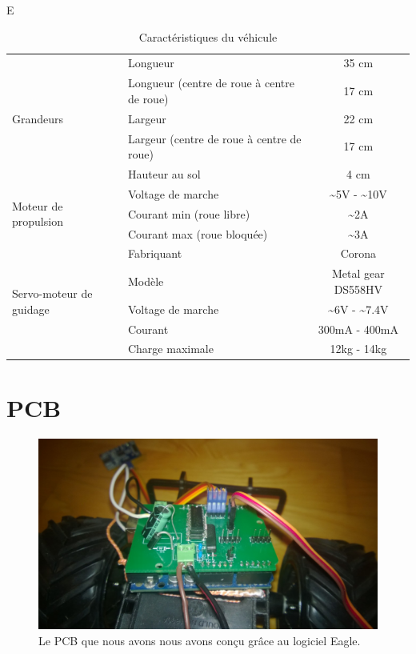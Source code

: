 \documentclass[a4paper,11pt]{report}
\begin{document}
{E
\begin{table}[h!]
\begin{center}
  \begin{tabular}{|p{4cm}|p{4cm}|c|}
    \hline
    \multirow{5}{*}{Grandeurs}
    &Longueur & 35 cm \\ \cline{2-3}
    &Longueur (centre de roue \`a centre de roue)& 17 cm \\ \cline{2-3}
    &Largeur & 22 cm \\ \cline{2-3}
    &Largeur (centre de roue \`a centre de roue) & 17 cm \\ \cline{2-3}
    & Hauteur au sol & 4 cm\\ \hline
    \multirow{3}{*}{Moteur de propulsion}
    & Voltage de marche & \~{}5V - \~{}10V  \\ \cline{2-3}
    & Courant min (roue libre) & \~{}2A \\ \cline{2-3}
    & Courant max (roue bloqu\'ee) & \~{}3A \\ \hline
    \multirow{5}{*}{Servo-moteur de guidage}
    & Fabriquant & Corona \\ \cline{2 - 3}
    & Modèle & Metal gear DS558HV\\ \cline{2-3}
    & Voltage de marche & \~{}6V - \~{}7.4V  \\ \cline{2-3}
    & Courant & 300mA - 400mA \\ \cline{2-3}
    & Charge maximale & 12kg - 14kg \\  
 \hline
	\end{tabular}
\end{center}
\caption{Caractéristiques du véhicule\label{caracteristiquesDuVehicule}}
\end{table}

\section{PCB}

\begin{figure}[h!]
\centering
\includegraphics[width=1.0\textwidth]{figures/PCB.jpg}
    \caption{\label{PCB} Le PCB que nous avons nous avons conçu grâce au logiciel Eagle.
    }
\end{figure}

}
\end{document}
